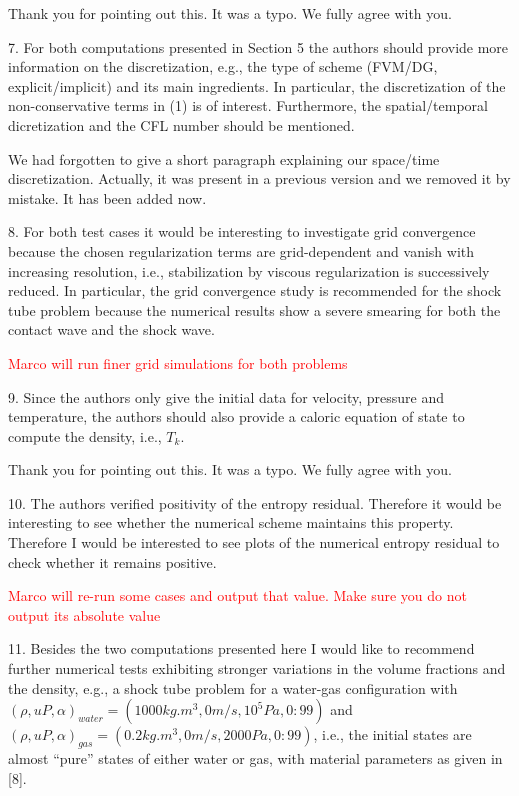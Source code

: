 \documentclass{article}
\newcommand{\tcr}[1]{\textcolor{red}{#1}}
\begin{document}
Thank you for pointing out this. It was a typo. We fully agree with you.
\bigskip


{\color{blue}
7. For both computations presented in Section 5 the authors should provide more 
information on the discretization, e.g., the type of scheme (FVM/DG, explicit/implicit)
and its main ingredients. In particular, the discretization of the non-conservative
terms in (1) is of interest. Furthermore, the spatial/temporal dicretization and the
CFL number should be mentioned.}

We had forgotten to give a short paragraph explaining our space/time discretization.
Actually, it was present in a previous version and we removed it by mistake. It has 
been added now.
\bigskip


{\color{blue}
8. For both test cases it would be interesting to investigate grid convergence because the
chosen regularization terms are grid-dependent and vanish with increasing resolution,
i.e., stabilization by viscous regularization is successively reduced. In particular, the
grid convergence study is recommended for the shock tube problem because the
numerical results show a severe smearing for both the contact wave and the shock
wave.}

\tcr{Marco will run finer grid simulations for both problems}
\bigskip


{\color{blue}
9. Since the authors only give the initial data for velocity, pressure and temperature,
the authors should also provide a caloric equation of state to compute the density,
i.e., $T_k$.}

Thank you for pointing out this. It was a typo. We fully agree with you.
\bigskip


{\color{blue}
10. The authors verified positivity of the entropy residual. Therefore it would be 
interesting to see whether the numerical scheme maintains this property. Therefore I
would be interested to see plots of the numerical entropy residual to check whether
it remains positive.}

\tcr{Marco will re-run some cases and output that value. Make sure you do not output its absolute value}
\bigskip


{\color{blue}
11. Besides the two computations presented here I would like to recommend further
numerical tests exhibiting stronger variations in the volume fractions and the density, 
e.g., a shock tube problem for a water-gas configuration with 
$(\rho, u P, \alpha)_{water} = (1000kg.m^3, 0m/s, 10^5Pa, 0:99)$ and 
$(\rho, u P, \alpha)_{gas}   = (0.2 kg.m^3, 0m/s, 2000Pa, 0:99)$,
i.e., the initial states are almost ``pure'' states of either water or gas, with material
parameters as given in [8].}
\end{document}
